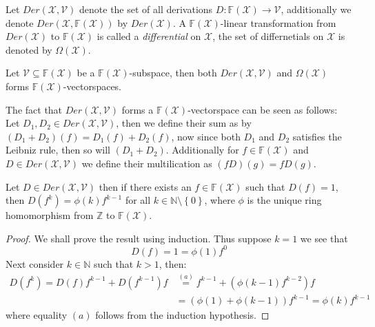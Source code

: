 \begin{definition}
  Let $Der(\mathcal{X}, \mathcal{V})$ denote the set of all derivations $D: \mathbb{F}(\mathcal{X}) \to \mathcal{V}$, additionally we denote $Der(\mathcal{X}, \mathbb{F}(\mathcal{X}))$ by $Der(\mathcal{X})$. A $\mathbb{F}(\mathcal{X})$-linear transformation from $Der(\mathcal{X})$ to $\mathbb{F}(\mathcal{X})$ is called a \textit{differential} on $\mathcal{X}$, the set of differnetials on $\mathcal{X}$ is denoted by $\Omega(\mathcal{X})$.
\end{definition}
Let $\mathcal{V} \subseteq \mathbb{F}(\mathcal{X})$ be a $\mathbb{F}(\mathcal{X})$-subspace, then both $Der(\mathcal{X}, \mathcal{V})$ and $\Omega(\mathcal{X})$ forms $\mathbb{F}(\mathcal{X})$-vectorspaces.

The fact that $Der(\mathcal{X}, \mathcal{V})$ forms a $\mathbb{F}(\mathcal{X})$-vectorspace can be seen as follows: Let $D_1, D_2 \in Der(\mathcal{X}, \mathcal{V})$, then we define their sum as by $(D_1 + D_2)(f) = D_1(f) + D_2(f)$, now since both $D_1$ and $D_2$ satisfies the Leibniz rule, then so will $(D_1 + D_2)$. Additionally for $f \in \mathbb{F}(\mathcal{X})$ and $D \in Der(\mathcal{X}, \mathcal{V})$ we define their multilication as $(fD)(g) = f D(g)$.

\begin{lemma}\label{lem:easy_lemma}
  Let $D \in Der(\mathcal{X}, \mathcal{V})$ then if there exists an $f \in \mathbb{F}(\mathcal{X})$ such that $D(f) = 1$, then $D(f^k) = \phi(k) f^{k - 1}$ for all $k \in \mathbb{N} \setminus \left\{0\right\}$, where $\phi$ is the unique ring homomorphism from $\mathbb{Z}$ to $\mathbb{F}(\mathcal{X})$.
\end{lemma}
\begin{proof}
  We shall prove the result using induction. Thus suppose $k = 1$ we see that
  \begin{equation*}
    D(f) = 1 = \phi(1)f^{0}
  \end{equation*}
  Next consider $k \in \mathbb{N}$ such that $k > 1$, then:
  \begin{align*}
     D(f^k) = D(f)f^{k - 1} + D(f^{k - 1})f &\stackrel{(a)}{=} f^{k - 1} + (\phi(k -  1) f^{k - 2})f\\ &= (\phi(1) + \phi(k - 1))  f^{k - 1} = \phi(k) f^{k - 1}
  \end{align*}
  where equality $(a)$ follows from the induction hypothesis.
\end{proof}

